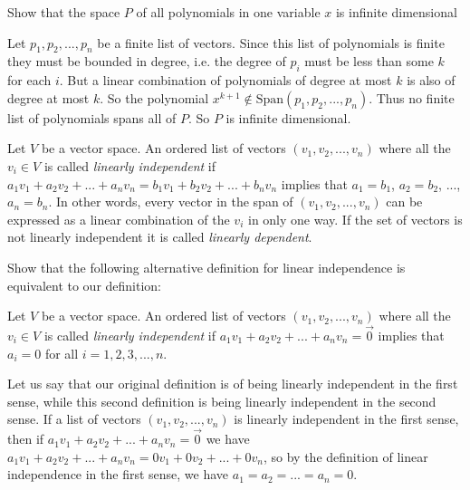 \documentclass{ximera}
\begin{document}
\begin{Basis and Dimension}
 	Show that the space $P$ of all polynomials in one variable $x$ is infinite dimensional

\begin{free-response}
	 Let $p_1,p_2,...,p_n$ be a finite list of  vectors.  
	Since this list of polynomials is finite they must be bounded in degree, i.e.  the degree of $p_i$ must be less than some $k$ for each $i$.  But a linear combination
	of polynomials of degree at most $k$ is also of degree at most $k$.  So the polynomial $x^{k+1} \not\in  \textrm{Span}(p_1,p_2,...,p_n)$. Thus no finite list of 
	polynomials spans all of $P$.  So $P$ is infinite dimensional.
\end{free-response}

 \begin{definition}
 	Let $V$ be a vector space. An ordered list of vectors $(v_1,v_2,...,v_n)$ where all the $v_i \in V$ is called \textit{linearly independent} if
 	$a_1v_1+a_2v_2 + ...+a_nv_n = b_1v_1 + b_2v_2 + ... + b_nv_n$ implies that $a_1  = b_1$, $a_2 = b_2$, ...,$a_n=b_n$.  In other words,
 	every vector in the span of $(v_1,v_2,...,v_n)$ can be expressed as a linear combination of the $v_i$ in only one way.  
 	If the set of vectors is not linearly independent it is called \textit{linearly dependent}.
 \end{definition}
 
 
 	Show that the following alternative definition for linear independence is equivalent to our definition:
 	
 	\begin{definition}
 		Let $V$ be a vector space. An ordered list of vectors $(v_1,v_2,...,v_n)$ where all the $v_i \in V$ is called \textit{linearly independent} if
 	$a_1v_1+a_2v_2 + ...+a_nv_n = \vec{0}$ implies that $a_i = 0 $ for all $i=1,2,3,...,n$.
 	\end{definition}
 	
 
 \begin{free-response}
	Let us say that our original definition is of  being linearly independent in the first sense, while this second definition is being linearly independent 
	in the second sense.  If a list of vectors $(v_1,v_2,...,v_n)$ is linearly independent in the first sense, then if $a_1v_1+a_2v_2 + ...+a_nv_n = \vec{0}$ we have
	$a_1v_1+a_2v_2 + ...+a_nv_n = 0v_1+0v_2+...+0v_n$, so by the definition of linear independence in the first sense, we have $a_1=a_2=...=a_n=0$.
	

\end{free-response}
\end{Basis and Dimension}
\end{document}
